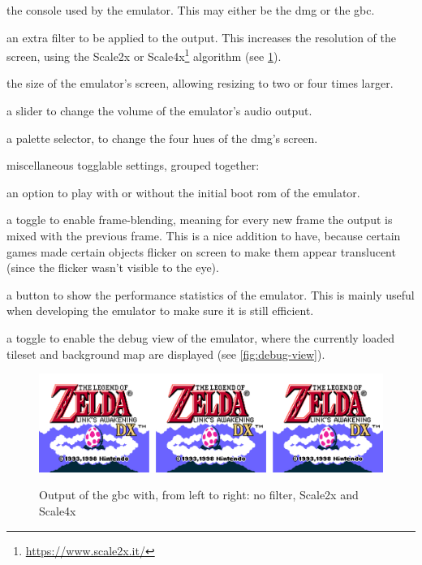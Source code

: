 \documentclass[11pt]{report}
\newcommand{\ftnt}[1]{\footnote{\url{#1}}}
\begin{document}
\begin{compactitem}
	\item the console used by the emulator. This may either be the \gls{dmg} or the \gls{gbc}.
	\item an extra filter to be applied to the output. This increases the resolution of the screen, using the Scale2x or Scale4x\ftnt{https://www.scale2x.it/} algorithm (see \ref{fig:scale-filter}).
	\item the size of the emulator's screen, allowing resizing to two or four times larger.
	\item a slider to change the volume of the emulator's audio output.
	\item a palette selector, to change the four hues of the \gls{dmg}'s screen.
	\item miscellaneous togglable settings, grouped together: 
	\begin{compactitem} 
		\item an option to play with or without the initial boot \gls{rom} of the emulator.
		\item a toggle to enable frame-blending, meaning for every new frame the output is mixed with the previous frame. This is a nice addition to have, because certain games made certain objects flicker on screen to make them appear translucent (since the flicker wasn't visible to the eye).
		\item a button to show the performance statistics of the emulator. This is mainly useful when developing the emulator to make sure it is still efficient.
		\item a toggle to enable the debug view of the emulator, where the currently loaded tileset and background map are displayed (see \ref{fig:debug-view}).
	\end{compactitem}
\end{compactitem}

\begin{figure}[h]
    \centering
    \includegraphics[width=15cm]{images/scale-filter}\\
    \caption{Output of the \gls{gbc} with, from left to right: no filter, Scale2x and Scale4x}
    \label{fig:scale-filter}
\end{figure}
\end{document}

